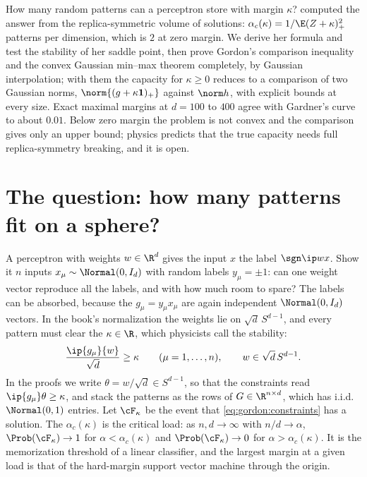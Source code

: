 \begin{refsection}

\begin{chaptersummary}
How many random patterns can a perceptron store with margin $\kappa$? \textcite{Gardner1988} computed the answer from the replica-symmetric volume of solutions: $\alpha_c(\kappa)=1/\E(Z+\kappa)_+^2$ patterns per dimension, which is $2$ at zero margin. We derive her formula and test the stability of her saddle point, then prove Gordon's comparison inequality and the convex Gaussian min--max theorem completely, by Gaussian interpolation; with them the capacity for $\kappa\ge0$ reduces to a comparison of two Gaussian norms, $\norm{(g+\kappa\mathbf 1)_+}$ against $\norm h$, with explicit bounds at every size. Exact maximal margins at $d=100$ to $400$ agree with Gardner's curve to about $0.01$. Below zero margin the problem is not convex and the comparison gives only an upper bound; physics predicts that the true capacity needs full replica-symmetry breaking, and it is open.
\end{chaptersummary}

\section{The question: how many patterns fit on a sphere?}\label{sec:gordon:question}

A perceptron with weights $w\in\R^d$ gives the input $x$ the label $\sgn\ip wx$. Show it $n$ inputs $x_\mu\sim\Normal(0,I_d)$ with random labels $y_\mu=\pm1$: can one weight vector reproduce all the labels, and with how much room to spare? The labels can be absorbed, because the  $g_\mu=y_\mu x_\mu$ are again independent $\Normal(0,I_d)$ vectors. In the book's normalization the weights lie on $\sqrt d\,S^{d-1}$, and every pattern must clear the  $\kappa\in\R$, which physicists call the stability:
\begin{equation}\label{eq:gordon:constraints}
\frac{\ip{g_\mu}{w}}{\sqrt d}\ge\kappa\qquad(\mu=1,\dots,n),\qquad w\in\sqrt d\,S^{d-1}.
\end{equation}
In the proofs we write $\theta=w/\sqrt d\in S^{d-1}$, so that the constraints read $\ip{g_\mu}\theta\ge\kappa$, and stack the patterns as the rows of $G\in\R^{n\times d}$, which has i.i.d.\ $\Normal(0,1)$ entries. Let $\cF_\kappa$ be the event that \eqref{eq:gordon:constraints} has a solution. The  $\alpha_c(\kappa)$ is the critical load: as $n,d\to\infty$ with $n/d\to\alpha$, $\Prob(\cF_\kappa)\to1$ for $\alpha<\alpha_c(\kappa)$ and $\Prob(\cF_\kappa)\to0$ for $\alpha>\alpha_c(\kappa)$. It is the memorization threshold of a linear classifier, and the largest margin at a given load is that of the hard-margin support vector machine through the origin.


\end{refsection}
